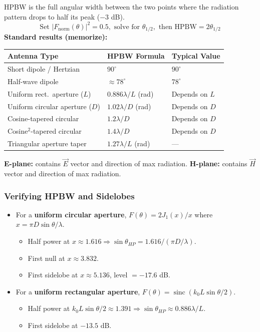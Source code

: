\documentclass[10pt,letterpaper]{article}
\newcommand{\vE}{\vec{E}}
\newcommand{\vH}{\vec{H}}
\newcommand{\sinc}{\operatorname{sinc}}
\newcommand{\degrees}{^{\circ}}
\begin{document}
\begin{tcolorbox}[formulabox, title={HPBW -- Definition \& Formulas}]
HPBW is the full angular width between the two points where the radiation pattern drops to half its peak ($-3$ dB).
\begin{equation}
  \text{Set } |F_\mathrm{norm}(\theta)|^2 = 0.5, \text{ solve for } \theta_{1/2}, \text{ then } \mathrm{HPBW} = 2\theta_{1/2}
\end{equation}
\textbf{Standard results (memorize):}
\begin{center}
\begin{tabular}{lll}
\toprule
\textbf{Antenna Type} & \textbf{HPBW Formula} & \textbf{Typical Value} \\
\midrule
Short dipole / Hertzian & $90\degrees$ & $90\degrees$ \\
Half-wave dipole & $\approx 78\degrees$ & $78\degrees$ \\
Uniform rect.\ aperture ($L$) & $0.886\lambda/L$ (rad) & Depends on $L$ \\
Uniform circular aperture ($D$) & $1.02\lambda/D$ (rad) & Depends on $D$ \\
Cosine-tapered circular & $1.2\lambda/D$ & Depends on $D$ \\
Cosine$^2$-tapered circular & $1.4\lambda/D$ & Depends on $D$ \\
Triangular aperture taper & $1.27\lambda/L$ (rad) & --- \\
\bottomrule
\end{tabular}
\end{center}
\textbf{E-plane:} contains $\vE$ vector and direction of max radiation.
\textbf{H-plane:} contains $\vH$ vector and direction of max radiation.
\end{tcolorbox}

\subsubsection{Verifying HPBW and Sidelobes}
\begin{itemize}[noitemsep]
  \item For a \textbf{uniform circular aperture}, $F(\theta) = 2J_1(x)/x$ where $x = \pi D\sin\theta/\lambda$.
    \begin{itemize}[noitemsep]
      \item Half power at $x \approx 1.616 \Rightarrow \sin\theta_{HP} = 1.616/(\pi D/\lambda)$.
      \item First null at $x \approx 3.832$.
      \item First sidelobe at $x \approx 5.136$, level $= -17.6$ dB.
    \end{itemize}
  \item For a \textbf{uniform rectangular aperture}, $F(\theta) = \sinc(k_0L\sin\theta/2)$.
    \begin{itemize}[noitemsep]
      \item Half power at $k_0L\sin\theta/2 \approx 1.391 \Rightarrow \sin\theta_{HP} \approx 0.886\lambda/L$.
      \item First sidelobe at $-13.5$ dB.
    \end{itemize}
\end{itemize}
\end{document}
